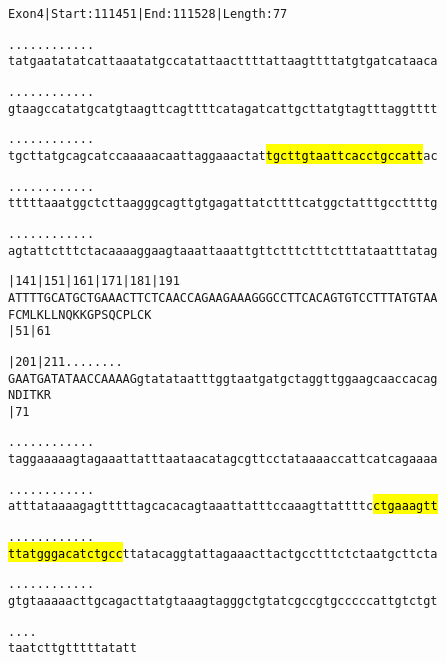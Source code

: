 \documentclass{article}
\begin{document}
\begin{alltt}
Exon 4 | Start: 111451 | End: 111528 | Length: 77

.    .    .    .    .    .    .    .    .    .    .    .    
tatgaatatatcattaaatatgccatattaacttttattaagttttatgtgatcataaca

.    .    .    .    .    .    .    .    .    .    .    .    
gtaagccatatgcatgtaagttcagttttcatagatcattgcttatgtagtttaggtttt

.    .    .    .    .    .    .    .    .    .    .    .    
tgcttatgcagcatccaaaaacaattaggaaactat\hl{tgcttgtaattcacctgccatt}ac

.    .    .    .    .    .    .    .    .    .    .    .    
tttttaaatggctcttaagggcagttgtgagattatcttttcatggctatttgccttttg

.    .    .    .    .    .    .    .    .    .    .    .    
agtattctttctacaaaaggaagtaaattaaattgttctttctttctttataatttatag

      |141      |151      |161      |171      |181      |191
ATTTTGCATGCTGAAACTTCTCAACCAGAAGAAAGGGCCTTCACAGTGTCCTTTATGTAA
 F  C  M  L  K  L  L  N  Q  K  K  G  P  S  Q  C  P  L  C  K 
                |51                           |61           

      |201      |211  .    .    .    .    .    .    .    .  
GAATGATATAACCAAAAGgtatataatttggtaatgatgctaggttggaagcaaccacag
 N  D  I  T  K  R                                           
                |71                                         

  .    .    .    .    .    .    .    .    .    .    .    .  
taggaaaaagtagaaattatttaataacatagcgttcctataaaaccattcatcagaaaa

  .    .    .    .    .    .    .    .    .    .    .    .  
atttataaaagagtttttagcacacagtaaattatttccaaagttattttc\hl{ctgaaagtt}

  .    .    .    .    .    .    .    .    .    .    .    .  
\hl{ttatgggacatctgcc}ttatacaggtattagaaacttactgcctttctctaatgcttcta

  .    .    .    .    .    .    .    .    .    .    .    .  
gtgtaaaaacttgcagacttatgtaaagtagggctgtatcgccgtgcccccattgtctgt

  .    .    .    .
taatcttgtttttatatt
\end{alltt}
\newpage
\end{document}
